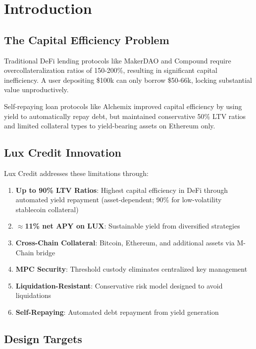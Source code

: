 \section{Introduction}


\subsection{The Capital Efficiency Problem}

Traditional DeFi lending protocols like MakerDAO and Compound require overcollateralization ratios of 150-200\%, resulting in significant capital inefficiency. A user depositing \$100k can only borrow \$50-66k, locking substantial value unproductively.

Self-repaying loan protocols like Alchemix improved capital efficiency by using yield to automatically repay debt, but maintained conservative 50\% LTV ratios and limited collateral types to yield-bearing assets on Ethereum only.

\subsection{Lux Credit Innovation}

Lux Credit addresses these limitations through:

\begin{enumerate}
\item \textbf{Up to 90\% LTV Ratios}: Highest capital efficiency in DeFi through automated yield repayment (asset-dependent; 90\% for low-volatility stablecoin collateral)
\item \textbf{$\approx$11\% net APY on LUX}: Sustainable yield from diversified strategies
\item \textbf{Cross-Chain Collateral}: Bitcoin, Ethereum, and additional assets via M-Chain bridge
\item \textbf{MPC Security}: Threshold custody eliminates centralized key management
\item \textbf{Liquidation-Resistant}: Conservative risk model designed to avoid liquidations
\item \textbf{Self-Repaying}: Automated debt repayment from yield generation
\end{enumerate}

\subsection{Design Targets}


